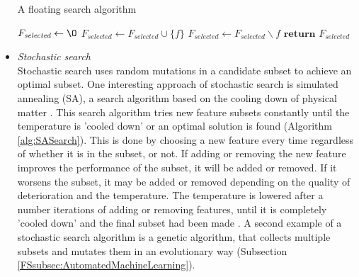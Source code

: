 \documentclass[10pt,a4paper]{report}
\begin{document}
\begin{itemize}
		\begin{algorithm}[h]
			\caption{A floating search algorithm \cite{Reunanen2006}}\label{alg:FloatingSearch}
			\begin{algorithmic}[1]
				\State $F_{\textit{selected}} \gets \O$			
					
					
				 
				\State $F_{\textit{selected}} \gets F_{\textit{selected}} \cup \{f\}$ 
				\EndIf
				\EndFor
				 
				 
				\State $F_{\textit{selected}} \gets F_{\textit{selected}} \backslash f$ 
				\EndIf
				\EndFor
				\EndWhile
				\State $\textbf{return } F_{\textit{selected}}$
				\EndProcedure
			\end{algorithmic}
		\end{algorithm}
		
		\item \textit{Stochastic search} \\
		
		Stochastic search uses random mutations in a candidate subset to achieve an optimal subset. One interesting approach of stochastic search is simulated annealing (SA), a search algorithm based on the cooling down of physical matter \cite{kirkpatrick1983optimization}. This search algorithm tries new feature subsets constantly until the temperature is 'cooled down' or an optimal solution is found (Algorithm \ref{alg:SASearch}). This is done by choosing a new feature every time regardless of whether it is in the subset, or not. If adding or removing the new feature improves the performance of the subset, it will be added or removed. If it worsens the subset, it may be added or removed depending on the quality of deterioration and the temperature. The temperature is lowered after a number iterations of adding or removing features, until it is completely 'cooled down' and the final subset had been made \cite{Reunanen2006}. A second example of a stochastic search algorithm is a genetic algorithm, that collects multiple subsets and mutates them in an evolutionary way \cite{Jirapech-Umpai2005} (Subsection \ref{FSsubsec:AutomatedMachineLearning}). 
		

\end{itemize}
\end{document}
